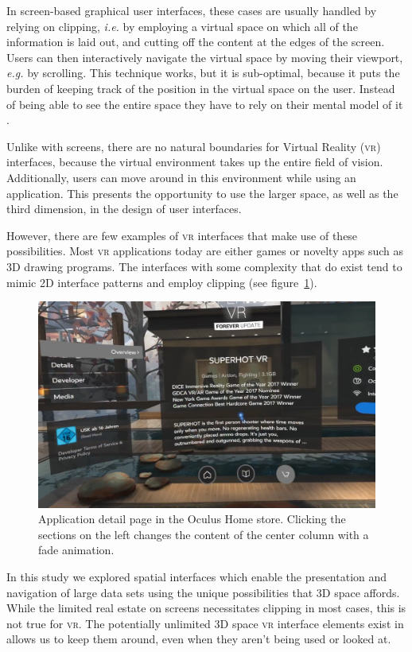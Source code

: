 \documentclass[nobib]{tufte-book} %
\newcommand{\hairsp}{\hspace{1pt}} %
\newcommand{\ie}{\textit{i.\hairsp{}e.}\xspace} %
\newcommand{\eg}{\textit{e.\hairsp{}g.}\xspace} %
\begin{document}
In screen-based graphical user interfaces, these cases are usually handled by relying on clipping, \ie by employing a virtual space on which all of the information is laid out, and cutting off the content at the edges of the screen. Users can then interactively navigate the virtual space by moving their viewport, \eg by scrolling. This technique works, but it is sub-optimal, because it puts the burden of keeping track of the position in the virtual space on the user. Instead of being able to see the entire space they have to rely on their mental model of it \cite{bederson2011promise}.

Unlike with screens, there are no natural boundaries for Virtual Reality (\textsc{vr}) interfaces, because the virtual environment takes up the entire field of vision. Additionally, users can move around in this environment while using an application. This presents the opportunity to use the larger space, as well as the third dimension, in the design of user interfaces.

However, there are few examples of \textsc{vr} interfaces that make use of these possibilities. Most \textsc{vr} applications today are either games or novelty apps such as 3D drawing programs.
The interfaces with some complexity that do exist tend to mimic 2D interface patterns and employ clipping (see figure~\ref{fig:superhot}).

\begin{figure}
  \includegraphics{superhot.png}
  \caption{Application detail page in the Oculus Home store. Clicking the sections on the left changes the content of the center column with a fade animation.}
  \label{fig:superhot}
\end{figure}

In this study we explored spatial interfaces which enable the presentation and navigation of large data sets using the unique possibilities that 3D space affords. While the limited real estate on screens necessitates clipping in most cases, this is not true for \textsc{vr}. The potentially unlimited 3D space \textsc{vr} interface elements exist in allows us to keep them around, even when they aren't being used or looked at.
\end{document}
